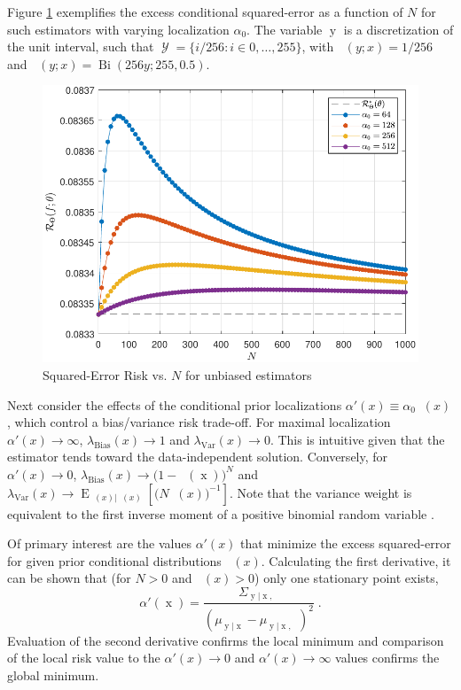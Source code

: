 \documentclass{article}
\DeclareMathOperator{\xrm}{\mathrm{x}}
\DeclareMathOperator{\yrm}{\mathrm{y}}
\DeclareMathOperator{\Erm}{\mathrm{E}}
\DeclareMathOperator{\Ycal}{\mathcal{Y}}
\DeclareMathOperator{\Bi}{\mathrm{Bi}}
\DeclareMathOperator{\thetam}{\theta_\text{m}}
\DeclareMathOperator{\upthetam}{\uptheta_\text{m}}
\DeclareMathOperator{\thetac}{\theta_\text{c}}
\DeclareMathOperator{\upthetac}{\uptheta_\text{c}}
\DeclareMathOperator{\uppsim}{\uppsi_\text{m}}
\DeclareMathOperator{\alpham}{\alpha_\text{m}}
\DeclareMathOperator{\alphac}{\alpha_\text{c}}
\begin{document}
Figure \ref{fig:Risk_cond_SE_Dir_N_leg_a0_unbiased} exemplifies the excess conditional squared-error as a function of $N$ for such estimators with varying localization $\alpha_0$. The variable $\yrm$ is a discretization of the unit interval, such that $\Ycal = \{i/256: i \in 0,\ldots,255\}$, with $\thetac(y;x) = 1/256$ and $\alphac(y;x) = \Bi(256y;255,0.5)$.
\begin{figure}
	\centering
	\includegraphics[width=1\linewidth]{Risk_cond_SE_Dir_N_leg_a0_unbiased_SSP.pdf}
	\caption{Squared-Error Risk vs. $N$ for unbiased estimators}
	\label{fig:Risk_cond_SE_Dir_N_leg_a0_unbiased}
\end{figure}



Next consider the effects of the conditional prior localizations $\alpha'(x) \equiv \alpha_0 \alpham(x)$, which control a bias/variance risk trade-off. For maximal localization $\alpha'(x) \to \infty$, $\lambda_{\text{Bias}}(x) \to 1$ and $\lambda_{\text{Var}}(x) \to 0$. This is intuitive given that the estimator tends toward the data-independent solution. Conversely, for $\alpha'(x) \to 0$, $\lambda_{\text{Bias}}(x) \to \big( 1 - \upthetam(\xrm) \big)^N$ and $\lambda_{\text{Var}}(x) \to \Erm_{\uppsim(x) | \upthetam(x)}\left[ \big( N \uppsim(x) \big)^{-1} \right]$. Note that the variance weight is equivalent to the first inverse moment of a positive binomial random variable \cite{stephan}. 


Of primary interest are the values $\alpha'(x)$ that minimize the excess squared-error for given prior conditional distributions $\alphac(x)$. Calculating the first derivative, it can be shown that (for $N > 0$ and $\thetam(x) > 0$) only one stationary point exists, 
\begin{equation} \label{eq:alpha_x_min_Rex}
\alpha'(\xrm) = \frac{\Sigma_{\yrm | \xrm,\upthetac}}{\left( \mu_{\yrm | \xrm} - \mu_{\yrm | \xrm,\upthetac} \right)^2} \;.
\end{equation}
Evaluation of the second derivative confirms the local minimum and comparison of the local risk value to the $\alpha'(x) \to 0$ and $\alpha'(x) \to \infty$ values confirms the global minimum.
\end{document}
